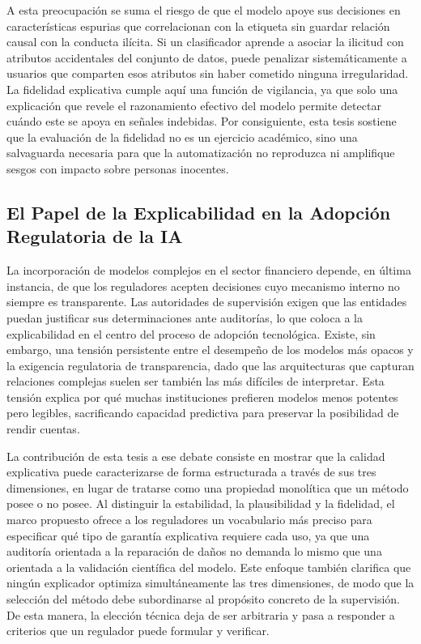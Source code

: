 A esta preocupación se suma el riesgo de que el modelo apoye sus decisiones en características espurias que correlacionan con la etiqueta sin guardar relación causal con la conducta ilícita. Si un clasificador aprende a asociar la ilicitud con atributos accidentales del conjunto de datos, puede penalizar sistemáticamente a usuarios que comparten esos atributos sin haber cometido ninguna irregularidad. La fidelidad explicativa cumple aquí una función de vigilancia, ya que solo una explicación que revele el razonamiento efectivo del modelo permite detectar cuándo este se apoya en señales indebidas. Por consiguiente, esta tesis sostiene que la evaluación de la fidelidad no es un ejercicio académico, sino una salvaguarda necesaria para que la automatización no reproduzca ni amplifique sesgos con impacto sobre personas inocentes.

\subsection{El Papel de la Explicabilidad en la Adopción Regulatoria de la IA}

La incorporación de modelos complejos en el sector financiero depende, en última instancia, de que los reguladores acepten decisiones cuyo mecanismo interno no siempre es transparente. Las autoridades de supervisión exigen que las entidades puedan justificar sus determinaciones ante auditorías, lo que coloca a la explicabilidad en el centro del proceso de adopción tecnológica. Existe, sin embargo, una tensión persistente entre el desempeño de los modelos más opacos y la exigencia regulatoria de transparencia, dado que las arquitecturas que capturan relaciones complejas suelen ser también las más difíciles de interpretar. Esta tensión explica por qué muchas instituciones prefieren modelos menos potentes pero legibles, sacrificando capacidad predictiva para preservar la posibilidad de rendir cuentas.

La contribución de esta tesis a ese debate consiste en mostrar que la calidad explicativa puede caracterizarse de forma estructurada a través de sus tres dimensiones, en lugar de tratarse como una propiedad monolítica que un método posee o no posee. Al distinguir la estabilidad, la plausibilidad y la fidelidad, el marco propuesto ofrece a los reguladores un vocabulario más preciso para especificar qué tipo de garantía explicativa requiere cada uso, ya que una auditoría orientada a la reparación de daños no demanda lo mismo que una orientada a la validación científica del modelo. Este enfoque también clarifica que ningún explicador optimiza simultáneamente las tres dimensiones, de modo que la selección del método debe subordinarse al propósito concreto de la supervisión. De esta manera, la elección técnica deja de ser arbitraria y pasa a responder a criterios que un regulador puede formular y verificar.

